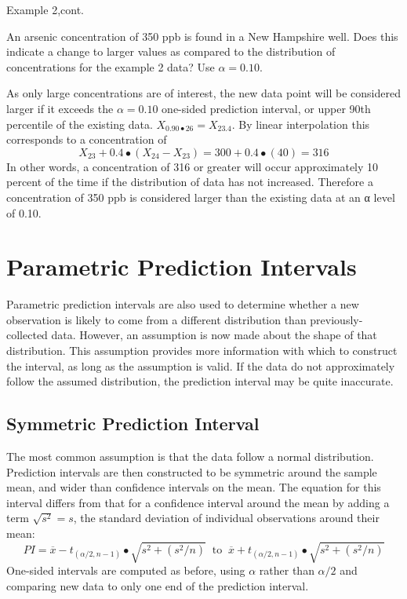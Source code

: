 \documentclass[]{book}
\begin{document}
Example 2,cont.

An arsenic concentration of 350 ppb is found in a New Hampshire well. Does this indicate a change to larger values as compared to the distribution of concentrations for the example 2 data? Use \(\alpha = 0.10\).

As only large concentrations are of interest, the new data point will be considered larger if it exceeds the \(\alpha = 0.10\) one-sided prediction interval, or upper 90th percentile of the existing data. \(X_{0.90 \bullet 26} = X_{23.4}\). By linear interpolation this corresponds to a concentration of \[X_{23} + 0.4 \bullet (X_{24} - X_{23}) = 300 + 0.4 \bullet (40) = 316\] In other words, a concentration of 316 or greater will occur approximately 10 percent of the time if the distribution of data has not increased. Therefore a concentration of 350 ppb is considered larger than the existing data at an α level of 0.10.

\hypertarget{ch3-6}{%
\section{Parametric Prediction Intervals}\label{ch3-6}}

Parametric prediction intervals are also used to determine whether a new observation is likely to come from a different distribution than previously-collected data. However, an assumption is now made about the shape of that distribution. This assumption provides more information with which to construct the interval, as long as the assumption is valid. If the data do not approximately follow the assumed distribution, the prediction interval may be quite inaccurate.

\hypertarget{symmetric-prediction-interval}{%
\subsection{Symmetric Prediction Interval}\label{symmetric-prediction-interval}}

The most common assumption is that the data follow a normal distribution. Prediction intervals are then constructed to be symmetric around the sample mean, and wider than confidence intervals on the mean. The equation for this interval differs from that for a confidence interval around the mean by adding a term \(\sqrt{s^{2}} = s\), the standard deviation of individual observations around their mean:
\begin{equation}
PI = \overline{x} - t_{(\alpha / 2, n - 1)} \bullet \sqrt{s^{2} + \left( s^{2} / n \right)} \;\; \text{to} \;\; \overline{x} + t_{(\alpha / 2, n - 1)} \bullet \sqrt{s^{2} + \left( s^{2} / n \right)}
\label{eq:3-12}
\end{equation}
One-sided intervals are computed as before, using \(\alpha\) rather than \(\alpha / 2\) and comparing new data to only one end of the prediction interval.
\end{document}
